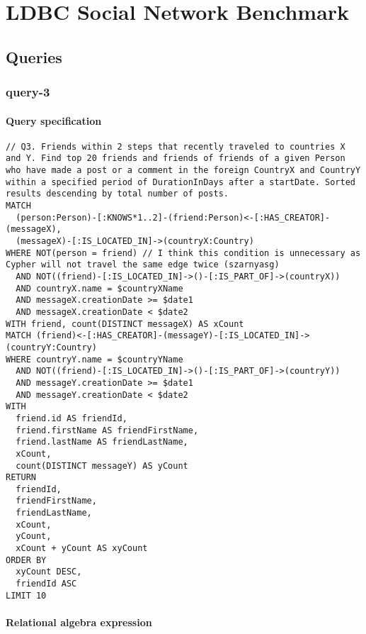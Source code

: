 \chapter{LDBC Social Network Benchmark}
\label{chp:ldbc-snb}

\section{Queries}

\subsection{query-3}

\subsubsection*{Query specification}

\begin{lstlisting}
// Q3. Friends within 2 steps that recently traveled to countries X and Y. Find top 20 friends and friends of friends of a given Person who have made a post or a comment in the foreign CountryX and CountryY within a specified period of DurationInDays after a startDate. Sorted results descending by total number of posts.
MATCH
  (person:Person)-[:KNOWS*1..2]-(friend:Person)<-[:HAS_CREATOR]-(messageX),
  (messageX)-[:IS_LOCATED_IN]->(countryX:Country)
WHERE NOT(person = friend) // I think this condition is unnecessary as Cypher will not travel the same edge twice (szarnyasg)
  AND NOT((friend)-[:IS_LOCATED_IN]->()-[:IS_PART_OF]->(countryX))
  AND countryX.name = $countryXName
  AND messageX.creationDate >= $date1
  AND messageX.creationDate < $date2
WITH friend, count(DISTINCT messageX) AS xCount
MATCH (friend)<-[:HAS_CREATOR]-(messageY)-[:IS_LOCATED_IN]->(countryY:Country)
WHERE countryY.name = $countryYName
  AND NOT((friend)-[:IS_LOCATED_IN]->()-[:IS_PART_OF]->(countryY))
  AND messageY.creationDate >= $date1
  AND messageY.creationDate < $date2
WITH
  friend.id AS friendId,
  friend.firstName AS friendFirstName,
  friend.lastName AS friendLastName,
  xCount,
  count(DISTINCT messageY) AS yCount
RETURN
  friendId,
  friendFirstName,
  friendLastName,
  xCount,
  yCount,
  xCount + yCount AS xyCount
ORDER BY
  xyCount DESC,
  friendId ASC
LIMIT 10
\end{lstlisting}

\subsubsection*{Relational algebra expression}

